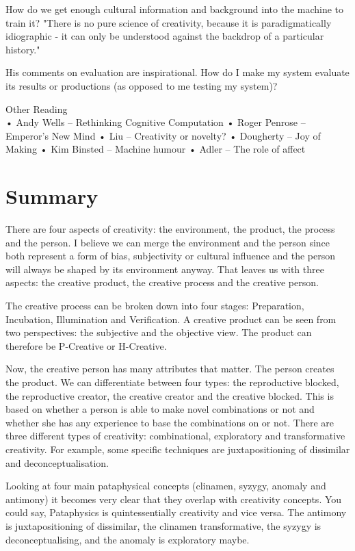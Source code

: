 How do we get enough cultural information and background into the machine to train it? "There is no pure science of creativity, because it is paradigmatically idiographic - it can only be understood against the backdrop of a particular history."

His comments on evaluation are inspirational. How do I make my system evaluate its results or productions (as opposed to me testing my system)?

Other Reading\\
•	Andy Wells – Rethinking Cognitive Computation \citep{Wells2005}
•	Roger Penrose – Emperor's New Mind \citep{Penrose1999}
•	Liu – Creativity or novelty? \citep{Liu2000}
•	Dougherty – Joy of Making \citep{Dougherty2008}
•	Kim Binsted – Machine humour \citep{Binstead1996}
•	Adler – The role of affect \citep{Adler2007}

\section{Summary}
There are four aspects of creativity: the environment, the product, the process and the person. I believe we can merge the environment and the person since both represent a form of bias, subjectivity or cultural influence and the person will always be shaped by its environment anyway. That leaves us with three aspects: the creative product, the creative process and the creative person.

The creative process can be broken down into four stages: Preparation, Incubation, Illumination and Verification. A creative product can be seen from two perspectives: the subjective and the objective view. The product can therefore be P-Creative or H-Creative.

Now, the creative person has many attributes that matter. The person creates the product. We can differentiate between four types: the reproductive blocked, the reproductive creator, the creative creator and the creative blocked. This is based on whether a person is able to make novel combinations or not and whether she has any experience to base the combinations on or not. There are three different types of creativity: combinational, exploratory and transformative creativity. For example, some specific techniques are juxtapositioning of dissimilar and deconceptualisation.

Looking at four main pataphysical concepts (clinamen, syzygy, anomaly and antimony) it becomes very clear that they overlap with creativity concepts. You could say, Pataphysics is quintessentially creativity and vice versa. The antimony is juxtapositioning of dissimilar, the clinamen transformative, the syzygy is deconceptualising, and the anomaly is exploratory maybe.

